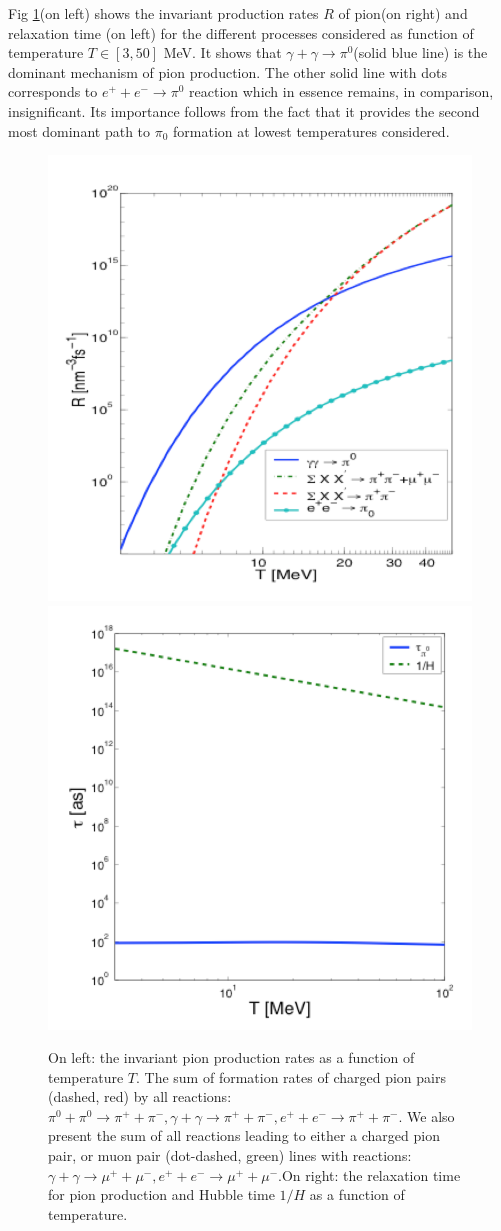 \documentclass[universe,article,submit,moreauthors,pdftex,a4paper]{Definitions/mdpi}
\begin{document}
Fig \ref{taumupi}(on left) shows the invariant production rates $R$ of pion(on right) and relaxation time (on left) for the different processes considered as function of temperature $T\in [3,50]$ MeV. It shows that $\gamma+\gamma\to \pi^0$(solid blue line) is the dominant mechanism of pion production. The other solid line with dots corresponds to $e^++e^-\to \pi^0$ reaction which in essence remains, in comparison, insignificant. Its importance follows from the fact that it provides the second most dominant path to $\pi_0$ formation at lowest temperatures considered.
\begin{figure}[h]
\centering
\includegraphics[width=0.47\columnwidth]{pions1.jpg}
\includegraphics[width=0.47\columnwidth]{taupi0.jpg}
\caption{On left: the invariant pion production rates as a function of temperature $T$. The sum of formation rates of charged pion pairs (dashed, red) by all reactions: $\pi^{0}+\pi^{0}\to \pi^{+}+\pi^{-},  \gamma+\gamma \to \pi^{+}+\pi^{-}, e^++e^-\to \pi^{+}+\pi^{-}$.
We also present the sum of all reactions leading to either a charged pion pair, or muon pair (dot-dashed, green) lines with reactions:$\gamma+\gamma \to \mu^{+}+\mu^{-}, e^++e^-\to \mu^{+}+\mu^{-}$.On right: the relaxation time for pion production and Hubble time $1/H$ as a function of temperature.}
\label{taumupi}
\end{figure}
\end{document}
